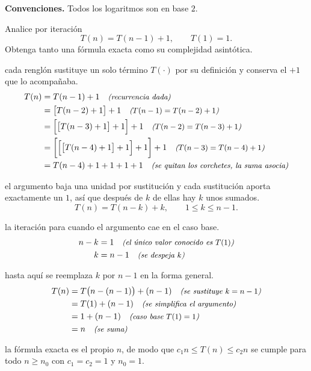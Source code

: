 \documentclass[11pt,letterpaper]{article}
\begin{document}

\noindent\textbf{Convenciones.}
Todos los logaritmos son en base $2$.

\noindent Analice por iteración
\[
  T(n) = T(n-1) + 1, \qquad T(1) = 1.
\]
Obtenga tanto una fórmula exacta como su complejidad asintótica.

 cada renglón sustituye un solo
término $T(\cdot)$ por su definición y conserva el $+1$ que lo
acompañaba.
\begin{align*}
  T(n) &= T(n-1) + 1
          \quad\text{\small\itshape (recurrencia dada)} \\
       &= \bigl[T(n-2) + 1\bigr] + 1
          \quad\text{\small\itshape ($T(n-1) = T(n-2) + 1$)} \\
       &= \Bigl[\bigl[T(n-3) + 1\bigr] + 1\Bigr] + 1
          \quad\text{\small\itshape ($T(n-2) = T(n-3) + 1$)} \\
       &= \biggl[\Bigl[\bigl[T(n-4) + 1\bigr] + 1\Bigr] + 1\biggr] + 1
          \quad\text{\small\itshape ($T(n-3) = T(n-4) + 1$)} \\
       &= T(n-4) + 1 + 1 + 1 + 1
          \quad\text{\small\itshape (se quitan los corchetes, la suma asocia)}
\end{align*}

 el argumento baja una unidad por sustitución y
cada sustitución aporta exactamente un $1$, así que después de $k$ de
ellas hay $k$ unos sumados.
\[
  T(n) = T(n-k) + k, \qquad 1 \le k \le n-1.
\]

 la iteración para cuando el argumento cae en
el caso base.
\begin{align*}
  n - k &= 1 \quad\text{\small\itshape (el único valor conocido es $T(1)$)} \\
      k &= n - 1 \quad\text{\small\itshape (se despeja $k$)}
\end{align*}

 hasta aquí se reemplaza $k$ por $n-1$ en
la forma general.
\begin{align*}
  T(n) &= T\bigl(n - (n-1)\bigr) + (n-1)
          \quad\text{\small\itshape (se sustituye $k = n-1$)} \\
       &= T(1) + (n-1)
          \quad\text{\small\itshape (se simplifica el argumento)} \\
       &= 1 + (n-1)
          \quad\text{\small\itshape (caso base $T(1) = 1$)} \\
       &= n
          \quad\text{\small\itshape (se suma)}
\end{align*}


 la fórmula exacta es el propio $n$, de modo que
$c_1 n \le T(n) \le c_2 n$ se cumple para todo $n \ge n_0$ con
$c_1 = c_2 = 1$ y $n_0 = 1$.

\end{document}

